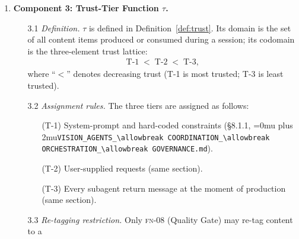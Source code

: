 \documentclass[12pt]{article}
\theoremstyle{definition}
\DeclareRobustCommand{\code}[1]{\begingroup\Urlmuskip=0mu plus 2mu\relax\nolinkurl{#1}\endgroup}
\newcommand{\FN}[1]{\textsc{fn-#1}}
\newcommand{\VisionGov}{\code{VISION\_AGENTS\_\allowbreak COORDINATION\_\allowbreak ORCHESTRATION\_\allowbreak GOVERNANCE.md}}
\begin{document}
\begin{enumerate}
\begin{enumerate}
               the Quality Gate; $\mathrm{Escalated}$ denotes
               circuit-breaker activation (\S5.3.2,
               \VisionGov{}).
    \item[2.7] \emph{Finiteness.}
               $|Q| = 8 < \infty$; $|\Sigma| < \infty$ (by
               Definition~\ref{def:state-machine} and the governance
               document); $|\delta| = |Q \times \Sigma| < \infty$.
    \item[2.8] \emph{Termination.}
               Every run terminates within at most $P + B$
               state-machine transitions.
               Proof: Theorem~\ref{thm:rework}
               (Section~\ref{sec:proofs}).
  \end{enumerate}

  \item \textbf{Component 3: Trust-Tier Function $\tau$.}
  \begin{enumerate}
    \item[3.1] \emph{Definition.}
               $\tau$ is defined in Definition~\ref{def:trust}.  Its
               domain is the set of all content items produced or
               consumed during a session; its codomain is the
               three-element trust lattice:
               \begin{align}
                 \mathrm{T\text{-}1}
                 \;<\; \mathrm{T\text{-}2}
                 \;<\; \mathrm{T\text{-}3},
                 \label{eq:trust-order}
               \end{align}
               where ``$<$'' denotes decreasing trust (T-1 is most
               trusted; T-3 is least trusted).
    \item[3.2] \emph{Assignment rules.}
               The three tiers are assigned as follows:
               \begin{enumerate}
                 \item[(T-1)] System-prompt and hard-coded constraints
                              (\S8.1.1, \VisionGov{}).
                 \item[(T-2)] User-supplied requests (same section).
                 \item[(T-3)] Every subagent return message at the
                              moment of production (same section).
               \end{enumerate}
    \item[3.3] \emph{Re-tagging restriction.}
               Only \FN{08} (Quality Gate) may re-tag content to a

\end{enumerate}
\end{enumerate}
\end{document}
